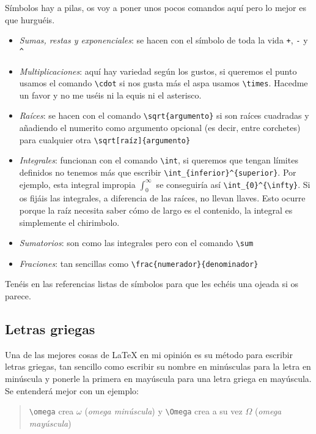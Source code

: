 Símbolos hay a pilas, os voy a poner unos pocos comandos aquí pero lo
mejor es que hurguéis.

\begin{itemize}
\item
  \emph{Sumas, restas y exponenciales}: se hacen con el símbolo de toda
  la vida \lstinline!+!, \lstinline!-! y \lstinline!^!
\item
  \emph{Multiplicaciones}: aquí hay variedad según los gustos, si
  queremos el punto usamos el comando \lstinline!\cdot! si nos gusta más
  el aspa usamos \lstinline!\times!. Hacedme un favor y no me uséis ni
  la equis ni el asterisco.
\item
  \emph{Raíces}: se hacen con el comando \lstinline!\sqrt{argumento}! si
  son raíces cuadradas y añadiendo el numerito como argumento opcional
  (es decir, entre corchetes) para cualquier otra
  \lstinline!\sqrt[raíz]{argumento}!
\item
  \emph{Integrales}: funcionan con el comando \lstinline!\int!, si
  queremos que tengan límites definidos no tenemos más que escribir
  \lstinline!\int_{inferior}^{superior}!. Por ejemplo, esta integral
  impropia \(\int_{0}^{\infty}\) se conseguiría así
  \lstinline!\int_{0}^{\infty}!. Si os fijáis las integrales, a
  diferencia de las raíces, no llevan llaves. Esto ocurre porque la raíz
  necesita saber cómo de largo es el contenido, la integral es
  simplemente el chirimbolo.
\item
  \emph{Sumatorios}: son como las integrales pero con el comando
  \lstinline!\sum!
\item
  \emph{Fraciones}: tan sencillas como
  \lstinline!\frac{numerador}{denominador}!
\end{itemize}

Tenéis en las referencias listas de símbolos para que les echéis una
ojeada si os parece.

\subsection{Letras griegas}\label{sec:letrasGriegas}

Una de las mejores cosas de LaTeX en mi opinión es su método para
escribir letras griegas, tan sencillo como escribir su nombre en
minúsculas para la letra en minúscula y ponerle la primera en mayúscula
para una letra griega en mayúscula. Se entenderá mejor con un ejemplo:

\begin{quote}
\lstinline!\omega! crea $\omega$ (\emph{omega minúscula}) y \lstinline!\Omega!
crea a su vez $\Omega$ (\emph{omega mayúscula})
\end{quote}

